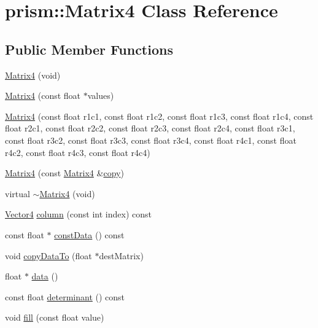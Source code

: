 \hypertarget{classprism_1_1_matrix4}{}\section{prism\+:\+:Matrix4 Class Reference}
\label{classprism_1_1_matrix4}
\subsection*{Public Member Functions}
\begin{DoxyCompactItemize}
\item 
\hyperlink{classprism_1_1_matrix4_a9db27bce505b827ee46568fb105ff563}{Matrix4} (void)
\item 
\hyperlink{classprism_1_1_matrix4_a442f58d6a24413f1e2cb7cf6150c5fb9}{Matrix4} (const float $\ast$values)
\item 
\hyperlink{classprism_1_1_matrix4_a6e19410eb6de5dfdaeb989d3042176a1}{Matrix4} (const float r1c1, const float r1c2, const float r1c3, const float r1c4, const float r2c1, const float r2c2, const float r2c3, const float r2c4, const float r3c1, const float r3c2, const float r3c3, const float r3c4, const float r4c1, const float r4c2, const float r4c3, const float r4c4)
\item 
\hyperlink{classprism_1_1_matrix4_a1112c0939a2dc4112d0552cafd37dff0}{Matrix4} (const \hyperlink{classprism_1_1_matrix4}{Matrix4} \&\hyperlink{namespaceprism_ae776f4cd825f79e7af1cf6ee1d90a209}{copy})
\item 
virtual \hyperlink{classprism_1_1_matrix4_a291c7d9ab1e3724801327a257d6ca6b9}{$\sim$\+Matrix4} (void)
\item 
\hyperlink{classprism_1_1_vector4}{Vector4} \hyperlink{classprism_1_1_matrix4_ab7eaeaa15cc37f55e745ea864965e7ab}{column} (const int index) const 
\item 
const float $\ast$ \hyperlink{classprism_1_1_matrix4_a0485348f17954d5bd7d8bd1c6c9bb752}{const\+Data} () const 
\item 
void \hyperlink{classprism_1_1_matrix4_a03e5bcf5cf9a158588c375ed2e926cfd}{copy\+Data\+To} (float $\ast$dest\+Matrix)
\item 
float $\ast$ \hyperlink{classprism_1_1_matrix4_a31eefea30e9a1d93d4941bdc12ab6ef7}{data} ()
\item 
const float \hyperlink{classprism_1_1_matrix4_adafd95c93e903c7d5971c860257e0921}{determinant} () const 
\item 
void \hyperlink{classprism_1_1_matrix4_a250d014842d71975bdfe34443703d090}{fill} (const float value)

\end{DoxyCompactItemize}
